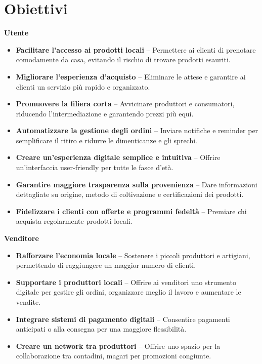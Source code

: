 \section{Obiettivi}

\textbf{Utente}
\begin{itemize}
    \item \textbf{Facilitare l'accesso ai prodotti locali} – Permettere ai clienti di prenotare comodamente da casa, evitando il rischio di trovare prodotti esauriti.
    \item  \textbf{Migliorare l'esperienza d'acquisto} – Eliminare le attese e garantire ai clienti un servizio più rapido e organizzato.
    \item  \textbf{Promuovere la filiera corta} – Avvicinare produttori e consumatori, riducendo l'intermediazione e garantendo prezzi più equi.
    \item  \textbf{Automatizzare la gestione degli ordini} – Inviare notifiche e reminder per semplificare il ritiro e ridurre le dimenticanze e gli sprechi.
    \item  \textbf{Creare un'esperienza digitale semplice e intuitiva} – Offrire un'interfaccia user-friendly per tutte le fasce d'età.
    \item  \textbf{Garantire maggiore trasparenza sulla provenienza} – Dare informazioni dettagliate su origine, metodo di coltivazione e certificazioni dei prodotti.
    \item  \textbf{Fidelizzare i clienti con offerte e programmi fedeltà} – Premiare chi acquista regolarmente prodotti locali.
\end{itemize}
    
\textbf{Venditore}
\begin{itemize}
    \item  \textbf{Rafforzare l'economia locale} – Sostenere i piccoli produttori e artigiani, permettendo di raggiungere un maggior numero di clienti.
    \item  \textbf{Supportare i produttori locali} – Offrire ai venditori uno strumento digitale per gestire gli ordini, organizzare meglio il lavoro e aumentare le vendite.
    \item  \textbf{Integrare sistemi di pagamento digitali} – Consentire pagamenti anticipati o alla consegna per una maggiore flessibilità.
    \item  \textbf{Creare un network tra produttori} – Offrire uno spazio per la collaborazione tra contadini, magari per promozioni congiunte.
\end{itemize}


